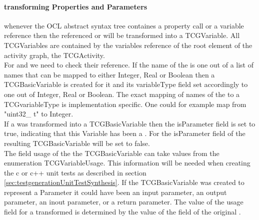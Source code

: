 \paragraph{transforming Properties and Parameters}
whenever the OCL abstract syntax tree containes a property call or a variable reference then the referenced  or  will be transformed into a TCGVariable. All TCGVariables are contained by the variables reference of the root element of the activity graph, the TCGActivity.\\
For  and  we need to check their  reference. If the name of the  is one out of a list of names that can be mapped to either Integer, Real or Boolean then a TCGBasicVariable is created for it and its variableType field set accordingly to one out of Integer, Real or Boolean. The exact mapping of names of the  to a TCGvariableType is implementation specific. One could for example map from "uint32\_ t" to Integer.\\
If a  was transformed into a TCGBasicVariable then the isParameter field is set to true, indicating that this Variable has been a . For  the isParameter field of the resulting TCGBasicVariable will be set to false.\\
The field usage of the the TCGBasicVariable can take values from the enumeration TCGVariableUsage. This information will be needed when creating the c or c++ unit tests as described in section \ref{sec:testgenerationUnitTestSynthesis}. If the TCGBasicVariable was created to represent a Parameter it could have been an input parameter, an output parameter, an inout parameter, or a return parameter. The value of the usage field for a transformed  is determined by the value of the  field of the original .\\




